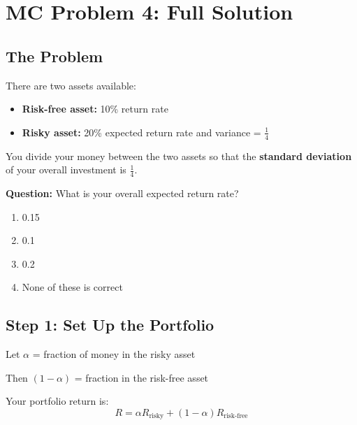\documentclass[12pt]{article}
\begin{document}
\section*{\LARGE MC Problem 4: Full Solution}

\subsection*{\large The Problem}

There are two assets available:
\begin{itemize}[leftmargin=2cm]
    \item \textbf{Risk-free asset:} 10\% return rate
    \item \textbf{Risky asset:} 20\% expected return rate and variance = $\frac{1}{4}$
\end{itemize}

\vspace{1em}

You divide your money between the two assets so that the \textbf{standard deviation} of your overall investment is $\frac{1}{4}$.

\vspace{1em}

\textbf{Question:} What is your overall expected return rate?

\begin{enumerate}[label=(\alph*), leftmargin=2cm]
    \item 0.15
    \item 0.1
    \item 0.2
    \item None of these is correct
\end{enumerate}

\vspace{2em}

\subsection*{\large Step 1: Set Up the Portfolio}

Let $\alpha$ = fraction of money in the risky asset

Then $(1-\alpha)$ = fraction in the risk-free asset

\vspace{1em}

Your portfolio return is:
\[
R = \alpha R_{\text{risky}} + (1-\alpha) R_{\text{risk-free}}
\]

\vspace{2em}
\end{document}
